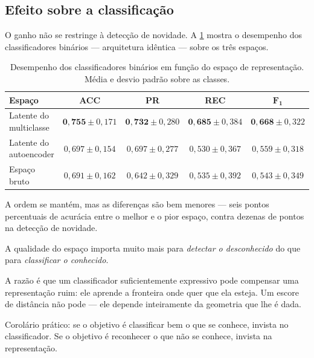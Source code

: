 \subsection{Efeito sobre a classificação}

O ganho não se restringe à detecção de novidade. A \cref{tab:mahal-classificacao} mostra
o desempenho dos classificadores binários --- arquitetura idêntica --- sobre os três
espaços.

\begin{table}[htbp]
\centering
\caption{Desempenho dos classificadores binários em função do espaço de representação.
Média e desvio padrão sobre as classes.}
\label{tab:mahal-classificacao}
\small
\begin{tabular}{lcccc}
\toprule
\textbf{Espaço} & \textbf{ACC} & \textbf{PR} & \textbf{REC} & $\bm{F_1}$ \\
\midrule
Latente do multiclasse & $\bm{0{,}755} \pm 0{,}171$ & $\bm{0{,}732} \pm 0{,}280$ &
                          $\bm{0{,}685} \pm 0{,}384$ & $\bm{0{,}668} \pm 0{,}322$ \\
Latente do autoencoder & $0{,}697 \pm 0{,}154$ & $0{,}697 \pm 0{,}277$ &
                          $0{,}530 \pm 0{,}367$ & $0{,}559 \pm 0{,}318$ \\
Espaço bruto           & $0{,}691 \pm 0{,}162$ & $0{,}642 \pm 0{,}329$ &
                          $0{,}535 \pm 0{,}392$ & $0{,}543 \pm 0{,}349$ \\
\bottomrule
\end{tabular}
\end{table}

A ordem se mantém, mas as diferenças são bem menores --- seis pontos percentuais de
acurácia entre o melhor e o pior espaço, contra dezenas de pontos na detecção de
novidade.

\begin{destaque}
A qualidade do espaço importa muito mais para \emph{detectar o desconhecido} do que para
\emph{classificar o conhecido}.

A razão é que um classificador suficientemente expressivo pode compensar uma
representação ruim: ele aprende a fronteira onde quer que ela esteja. Um escore de
distância não pode --- ele depende inteiramente da geometria que lhe é dada.

Corolário prático: se o objetivo é classificar bem o que se conhece, invista no
classificador. Se o objetivo é reconhecer o que não se conhece, invista na
representação.
\end{destaque}


